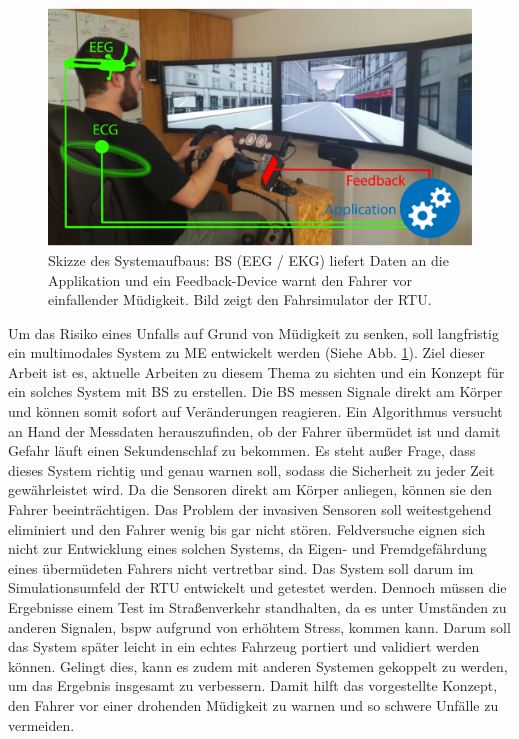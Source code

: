 {\begin{figure} 
  \begin{center}
    \includegraphics[width=12cm]{img/aufbau}
    \caption{Skizze des Systemaufbaus: \acl{BS} (EEG / EKG) liefert Daten an die Applikation und ein Feedback-Device warnt den Fahrer vor einfallender Müdigkeit. Bild zeigt den Fahrsimulator der \acl{RTU}.}
    \label{fig:sketch}
  \end{center}
\end{figure}

Um das Risiko eines Unfalls auf Grund von Müdigkeit zu senken, soll langfristig ein multimodales System zu \acl{ME} entwickelt werden (Siehe Abb. \ref{fig:sketch}). Ziel dieser Arbeit ist es, aktuelle Arbeiten zu diesem Thema zu sichten und ein Konzept für ein solches System mit \acl{BS} zu erstellen. Die \acl{BS} messen Signale direkt am Körper und können somit sofort auf Veränderungen reagieren. Ein Algorithmus versucht an Hand der Messdaten herauszufinden, ob der Fahrer übermüdet ist und damit Gefahr läuft einen Sekundenschlaf zu bekommen. Es steht außer Frage, dass dieses System richtig und genau warnen soll, sodass die Sicherheit zu jeder Zeit gewährleistet wird. Da die Sensoren direkt am Körper anliegen, können sie den Fahrer beeinträchtigen. Das Problem der invasiven Sensoren soll weitestgehend eliminiert und den Fahrer wenig bis gar nicht stören. Feldversuche eignen sich nicht zur Entwicklung eines solchen Systems, da Eigen- und Fremdgefährdung eines übermüdeten Fahrers nicht vertretbar sind. Das System soll darum im Simulationsumfeld der \acl{RTU} entwickelt und getestet werden. Dennoch müssen die Ergebnisse einem Test im Straßenverkehr standhalten, da es unter Umständen zu anderen Signalen, \acl{bspw} aufgrund von erhöhtem Stress, kommen kann. Darum soll das System später leicht in ein echtes Fahrzeug portiert und validiert werden können. Gelingt dies, kann es zudem mit anderen Systemen gekoppelt zu werden, um das Ergebnis insgesamt zu verbessern. Damit hilft das vorgestellte Konzept, den Fahrer vor einer drohenden Müdigkeit zu warnen und so schwere Unfälle zu vermeiden.\\ 

}
